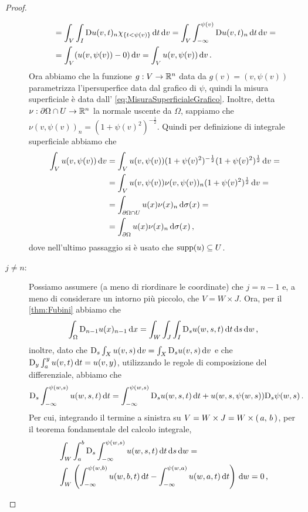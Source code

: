 \begin{proof}
\begin{description}
\begin{align*}
				& = \int_V \int_I \mathrm D u(v,t)_n \chi_{\{t<\psi(v)\}} \,\mathrm d t \,\mathrm d v =
				\int_V \int_{-\infty}^{\psi(v)} \mathrm D u(v,t)_n \,\mathrm d t \,\mathrm d v = \\
				& = \int_V (u(v,\psi(v)) - 0) \,\mathrm d v = \int_V u(v,\psi(v)) \,\mathrm d v\, \text{. }
			\end{align*}
			Ora abbiamo che la funzione $g:V\rightarrow \mathbb R^n$ data da $g(v)=(v,\psi(v))$ parametrizza l'ipersuperfice data dal grafico di
			$\psi$, quindi la misura superficiale è data dall' \cref{eq:MisuraSuperficialeGrafico}.
			Inoltre, detta $\nu:\partial \Omega \cap U \rightarrow \mathbb R^n$ la normale uscente da $\Omega$, sappiamo che
			$\nu(v,\psi(v))_n=(1+\psi(v)^2)^{-\frac{1}{2}}$. Quindi per definizione di integrale superficiale abbiamo che
			\begin{align*}
				\int_V u(v,\psi(v)) \,\mathrm d v &= \int_V u(v,\psi(v)) (1+\psi(v)^2)^{-\frac{1}{2}} (1+\psi(v)^2)^{\frac{1}{2}} \,\mathrm d v = \\
				& = \int_V u(v,\psi(v)) \nu(v,\psi(v))_n (1+\psi(v)^2)^{\frac{1}{2}} \,\mathrm d v = \\
				& = \int_{\partial \Omega \cap U} u(x) \nu(x)_n \,\mathrm d \sigma(x) = \\
				& = \int_{\partial \Omega} u(x) \nu(x)_n \,\mathrm d \sigma(x)\, \text{, }
			\end{align*}
			dove nell'ultimo passaggio si è usato che $\operatorname{supp}(u)\subseteq U$.
		\item [$j\neq n$:] Possiamo assumere (a meno di riordinare le coordinate) che $j=n-1$ e, a meno di considerare un intorno più piccolo,
			che $V=W \times J$. Ora, per il \cref{thm:Fubini} abbiamo che
			\[
				\int_{\Omega} \mathrm D_{n-1} u(x)_{n-1} \,\mathrm d x = \int_W \int_J \int_I \mathrm D_s u(w,s,t) \,\mathrm d t \,\mathrm d s \,\mathrm d w\, \text{, }
			\]
			inoltre, dato che $\mathrm D_s \int_X u(v,s)\,\mathrm d v = \int_X \mathrm D_s u(v,s)\,\mathrm d v$ e che $\mathrm D_y \int_a^y u(v,t)\,\mathrm d t=u(v,y)$,
			utilizzando le regole di composizione del differenziale, abbiamo che
			\[
				\mathrm D_s \int_{-\infty}^{\psi(w,s)} u(w,s,t) \,\mathrm d t =
				\int_{-\infty}^{\psi(w,s)} \mathrm D_s u(w,s,t) \,\mathrm d t + u(w,s,\psi(w,s))\mathrm D_s \psi (w,s)\, \text{. }
			\]
			Per cui, integrando il termine a sinistra su $V=W\times J=W\times \left(\,a,\,b\,\right)$, per il teorema fondamentale del
			calcolo integrale,
			\begin{align*}
				&\int_W \int_a^b \mathrm D_s \int_{-\infty}^{\psi(w,s)} u(w,s,t) \,\mathrm d t \,\mathrm d s \,\mathrm d w = \\
				&\int_W \left(\int_{-\infty}^{\psi(w,b)} u(w,b,t) \,\mathrm d t - \int_{-\infty}^{\psi(w,a)} u(w,a,t) \,\mathrm d t\right) \,\mathrm d w
				= 0\, \text{, }
			\end{align*}

\end{description}
\end{proof}
